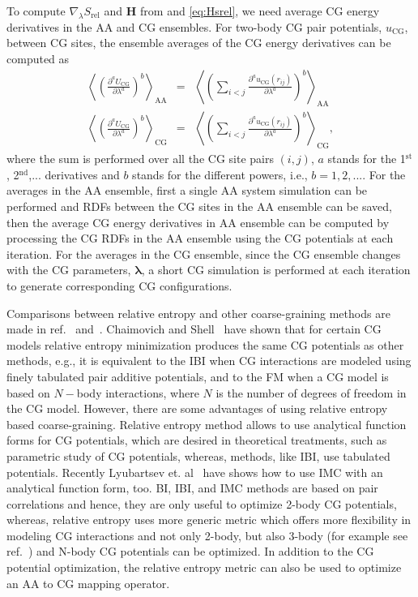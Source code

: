 To compute $\nabla_{\lambda}S_{\text{rel}}$ and $\mathbf{H}$ from 
and \ref{eq:Hsrel}, we need average CG energy derivatives in the AA and CG
ensembles. For two-body CG pair potentials, $u_{\text{CG}}$, between CG sites,
the ensemble averages of the CG energy derivatives can be computed as
\begin{eqnarray}
\left\langle\left(\frac{\partial^a U_{\text{CG}}}{\partial \lambda^a}\right)^b
\right\rangle_{\text{AA}}& =
&\left\langle\left(\sum_{i<j}\frac{\partial^{a}u_{\text{CG}}(r_{ij})}
{\partial \lambda^a}\right)^b\right\rangle_{\text{AA}}\nonumber \\
\left\langle\left(\frac{\partial^a U_{\text{CG}}}{\partial \lambda^a}\right)^b
\right\rangle_{\text{CG}}& =
&\left\langle\left(\sum_{i<j}\frac{\partial^{a}u_{\text{CG}}(r_{ij})}
{\partial \lambda^a}\right)^b\right\rangle_{\text{CG}}  ,
\end{eqnarray}
where the sum is performed over all the CG site pairs $(i,j)$, $a$ stands for
the 1$^{\text{st}}$, 2$^{\text{nd}}$,...  derivatives and $b$ stands for the
different powers, i.e., $b=1,2,...$. For the averages in the AA ensemble, first
a single AA system simulation can be performed and RDFs between the CG sites in
the AA ensemble can be saved, then the average CG energy derivatives in AA
ensemble can be computed by processing the CG RDFs in the AA ensemble using the
CG potentials at each iteration. For the averages in the CG ensemble, since the
CG ensemble changes with the CG parameters, $\boldsymbol\lambda$, a short CG
simulation is performed at each iteration to generate corresponding CG
configurations.

Comparisons between relative entropy and other coarse-graining methods are made
in ref.~\cite{rudzinski_coarse-graining_2011}
and~\cite{Chaimovich2011}. Chaimovich and Shell~\cite{Chaimovich2011} have shown
that for certain CG models relative entropy minimization produces the same CG
potentials as other methods, e.g., it is equivalent to the IBI when CG
interactions are modeled using finely tabulated pair additive potentials, and to
the FM when a CG model is based on $N-$body interactions, where $N$ is the
number of degrees of freedom in the CG model. However, there are some advantages
of using relative entropy based coarse-graining. Relative entropy method allows
to use analytical function forms for CG potentials, which are desired in
theoretical treatments, such as parametric study of CG potentials, whereas,
methods, like IBI, use tabulated potentials. Recently Lyubartsev et.
al~\cite{lyubartsev2010systematic} have shows how to use IMC with an analytical
function form, too.  BI, IBI, and IMC methods are based on pair correlations and
hence, they are only useful to optimize 2-body CG potentials, whereas, relative
entropy uses more generic metric which offers more flexibility in modeling CG
interactions and not only 2-body, but also 3-body (for example see
ref.~\cite{lu_coarse-graining_2014}) and N-body CG potentials can be
optimized. In addition to the CG potential optimization, the relative entropy
metric can also be used to optimize an AA to CG mapping operator.


